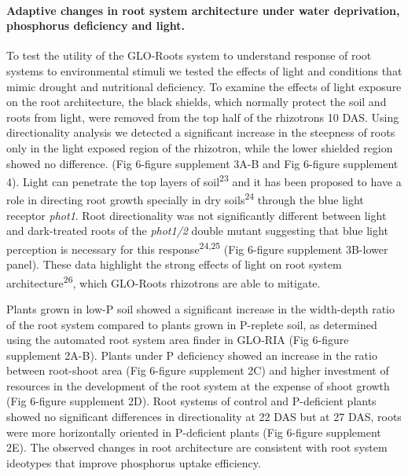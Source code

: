 \documentclass[]{article}
\begin{document}
\paragraph{Adaptive changes in root system architecture under water
deprivation, phosphorus deficiency and
light.}\label{adaptive-changes-in-root-system-architecture-under-water-deprivation-phosphorus-deficiency-and-light.}

To test the utility of the GLO-Roots system to understand response of
root systems to environmental stimuli we tested the effects of light and
conditions that mimic drought and nutritional deficiency. To examine the
effects of light exposure on the root architecture, the black shields,
which normally protect the soil and roots from light, were removed from
the top half of the rhizotrons 10 DAS. Using directionality analysis we
detected a significant increase in the steepness of roots only in the
light exposed region of the rhizotron, while the lower shielded region
showed no difference. (Fig 6-figure supplement 3A-B and Fig 6-figure
supplement 4). Light can penetrate the top layers of
soil\textsuperscript{23} and it has been proposed to have a role in
directing root growth specially in dry soils\textsuperscript{24} through
the blue light receptor \emph{phot1}. Root directionality was not
significantly different between light and dark-treated roots of the
\emph{phot1/2} double mutant suggesting that blue light perception is
necessary for this response\textsuperscript{24,25} (Fig 6-figure
supplement 3B-lower panel). These data highlight the strong effects of
light on root system architecture\textsuperscript{26}, which GLO-Roots
rhizotrons are able to mitigate.

Plants grown in low-P soil showed a significant increase in the
width-depth ratio of the root system compared to plants grown in
P-replete soil, as determined using the automated root system area
finder in GLO-RIA (Fig 6-figure supplement 2A-B). Plants under P
deficiency showed an increase in the ratio between root-shoot area (Fig
6-figure supplement 2C) and higher investment of resources in the
development of the root system at the expense of shoot growth (Fig
6-figure supplement 2D). Root systems of control and P-deficient plants
showed no significant differences in directionality at 22 DAS but at 27
DAS, roots were more horizontally oriented in P-deficient plants (Fig
6-figure supplement 2E). The observed changes in root architecture are
consistent with root system ideotypes that improve phosphorus uptake
efficiency.
\end{document}
